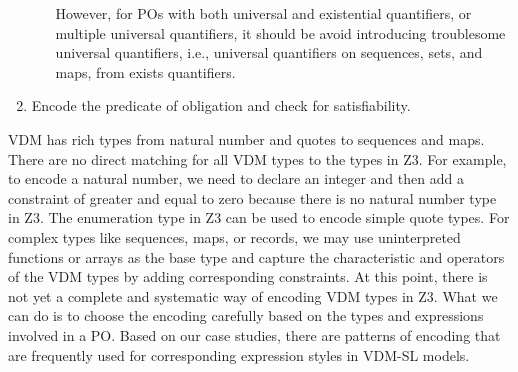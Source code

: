 \begin{enumerate}
\begin{enumerate}
However, for POs with both universal and existential quantifiers, or multiple universal quantifiers, it should be avoid introducing troublesome universal quantifiers, i.e., universal quantifiers on sequences, sets, and maps, from exists quantifiers.
\end{enumerate}
\item
Encode the predicate of obligation and check for satisfiability.
\end{enumerate}

VDM has rich types from natural number and quotes to sequences and maps. There are no direct matching for all VDM types to the types in Z3. For example, to encode a natural number, we need to declare an integer and then add a constraint of greater and equal to zero because there is no natural number type in Z3. The enumeration type in Z3 can be used to encode simple quote types. For complex types like sequences, maps, or records, we may use uninterpreted functions or arrays as the base type and capture the characteristic and operators of the VDM types by adding corresponding constraints. At this point, there is not yet a complete and systematic way of encoding VDM types in Z3. What we can do is to choose the encoding carefully based on the types and expressions involved in a PO. Based on our case studies, there are patterns of encoding that are frequently used for corresponding expression styles in VDM-SL models.
